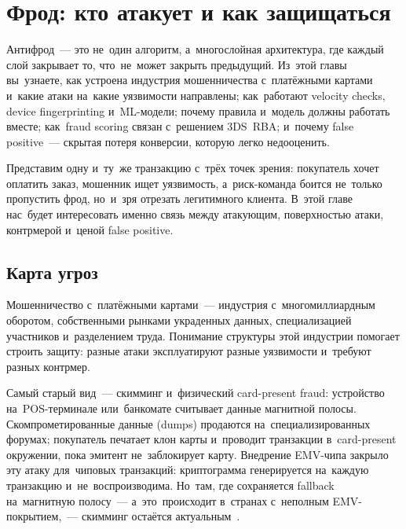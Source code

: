 \chapter{Фрод: кто атакует и как защищаться}
\label{ch:fraud}

\begin{kaobox}[title=Что вы узнаете из этой главы]
  Антифрод~--- это не~один алгоритм, а~многослойная архитектура, где
  каждый слой закрывает то, что~не~может закрыть предыдущий. Из~этой
  главы вы~узнаете, как устроена индустрия мошенничества с~платёжными
  картами и~какие атаки на~какие уязвимости направлены; как~работают
  velocity checks, device fingerprinting и~ML-модели; почему правила
  и~модель должны работать вместе; как~fraud scoring связан с~решением
  3DS~RBA; и~почему false positive~--- скрытая потеря конверсии, которую
  легко недооценить.
\end{kaobox}

Представим одну и~ту~же транзакцию с~трёх точек зрения: покупатель
хочет оплатить заказ, мошенник ищет уязвимость, а~риск-команда боится
не~только пропустить фрод, но~и~зря отрезать легитимного клиента.
В~этой главе нас~будет интересовать именно связь между атакующим,
поверхностью атаки, контрмерой и~ценой false positive.


\section{Карта угроз}
\label{sec:fraud-threats}

Мошенничество с~платёжными картами~--- индустрия с~многомиллиардным
оборотом, собственными рынками украденных данных, специализацией участников
и~разделением труда. Понимание структуры этой индустрии помогает
строить защиту: разные атаки эксплуатируют разные уязвимости и~требуют
разных контрмер.

Самый старый вид~--- скимминг и~физический card-present fraud:
устройство на~POS-терминале или~банкомате считывает данные магнитной
полосы. Скомпрометированные данные (dumps) продаются на~специализированных
форумах; покупатель печатает клон карты и~проводит транзакции в~card-present
окружении, пока эмитент не~заблокирует карту. Внедрение EMV-чипа закрыло
эту атаку для~чиповых транзакций: криптограмма генерируется на~каждую
транзакцию и~не~воспроизводима. Но~там, где сохраняется fallback
на~магнитную полосу~--- а~это~происходит в~странах с~неполным EMV-покрытием,~---
скимминг остаётся актуальным~.

